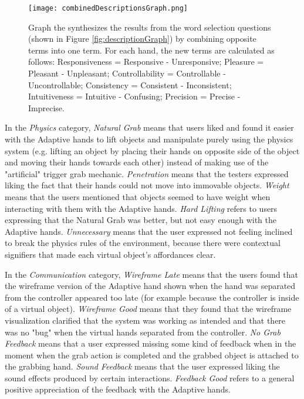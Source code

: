 \begin{figure}[H]
\centering
\texttt{[image: combinedDescriptionsGraph.png]}
\caption{Graph the synthesizes the results from the word selection questions (shown in Figure \ref{fig:descriptionGraph}) by combining opposite terms into one term. For each hand, the new terms are calculated as follows: Responsiveness = Responsive - Unresponsive; Pleasure = Pleasant - Unpleasant; Controllability = Controllable - Uncontrollable; Consistency = Consistent - Inconsistent; Intuitiveness = Intuitive - Confusing; Precision = Precise - Imprecise.}
\label{fig:combinedDescriptionsGraph}
\end{figure}

In the \textit{Physics} category, \textit{Natural Grab} means that users liked and found it easier with the Adaptive hands to lift objects and manipulate purely using the physics system (e.g. lifting an object by placing their hands on opposite side of the object and moving their hands towards each other) instead of making use of the "artificial" trigger grab mechanic. \textit{Penetration} means that the testers expressed liking the fact that their hands could not move into immovable objects. \textit{Weight} means that the users mentioned that objects seemed to have weight when interacting with them with the Adaptive hands. \textit{Hard Lifting} refers to users expressing that the Natural Grab was better, but not easy enough with the Adaptive hands. \textit{Unnecessary} means that the user expressed not feeling inclined to break the physics rules of the environment, because there were contextual signifiers \parencite{Norman2010} that made each virtual object's affordances clear.

In the \textit{Communication} category, \textit{Wireframe Late} means that the users found that the wireframe version of the Adaptive hand shown when the hand was separated from the controller appeared too late (for example because the controller is inside of a virtual object). \textit{Wireframe Good} means that they found that the wireframe visualization clarified that the system was working as intended and that there was no "bug" when the virtual hands separated from the controller. \textit{No Grab Feedback} means that a user expressed missing some kind of feedback when in the moment when the grab action is completed and the grabbed object is attached to the grabbing hand. \textit{Sound Feedback} means that the user expressed liking the sound effects produced by certain interactions. \textit{Feedback Good} refers to a general positive appreciation of the feedback with the Adaptive hands.

